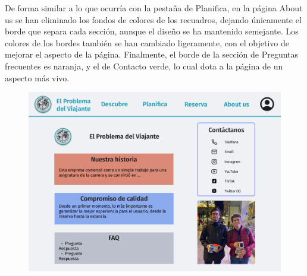\documentclass[11pt, a4paper]{book}
\begin{document}
	De forma similar a lo que ocurría con la pestaña de Planifica, en la página About us se han eliminado los fondos de colores de los recuadros, dejando únicamente el borde que separa cada sección, aunque el diseño se ha mantenido semejante. Los colores de los bordes también se han cambiado ligeramente, con el objetivo de mejorar el aspecto de la página. Finalmente, el borde de la sección de Preguntas frecuentes es naranja, y el de Contacto verde, lo cual dota a la página de un aspecto más vivo.
	
	\begin{figure} [H]
		\centering
		\begin{minipage}[c]{0.45\textwidth}
			\centering
			\includegraphics[width=\textwidth]{mockup-about_us.png}
		\end{minipage}
		\hspace{0.04\textwidth}
		\begin{minipage}[c]{0.45\textwidth}
			\centering

\end{minipage}
\end{figure}
\end{document}
